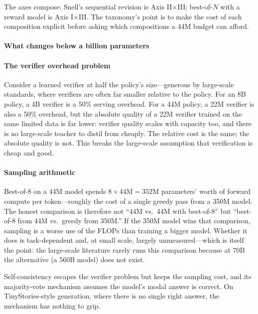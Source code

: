 The axes compose: Snell's sequential revision is Axis II$\times$III;
best-of-$N$ with a reward model is Axis I$\times$III. The taxonomy's
point is to make the cost of each composition explicit before asking
which compositions a 44M budget can afford.

\paragraph{What changes below a billion parameters}

\paragraph{The verifier overhead problem}

Consider a learned verifier at half the policy's size---generous by
large-scale standards, where verifiers are often far smaller
relative to the policy. For an 8B policy, a 4B verifier is a 50\%
serving overhead. For a 44M policy, a 22M verifier is also a 50\%
overhead, but the absolute quality of a 22M verifier trained on the
same limited data is far lower: verifier quality scales with capacity
too, and there is no large-scale teacher to distil from cheaply. The
relative cost is the same; the absolute quality is not. This breaks
the large-scale assumption that verification is cheap and good.

\paragraph{Sampling arithmetic}

Best-of-8 on a 44M model spends $8 \times 44\text{M} = 352\text{M}$
parameters' worth of forward compute per token---roughly the cost of a
single greedy pass from a 350M model. The honest comparison is therefore
not ``44M vs.\ 44M with best-of-8'' but ``best-of-8 from 44M vs.\
greedy from 350M.'' If the 350M model wins that comparison, sampling is
a worse use of the FLOPs than training a bigger model. Whether it does
is task-dependent and, at small scale, largely unmeasured---which is
itself the point: the large-scale literature rarely runs this
comparison because at 70B the alternative (a 560B model) does not exist.

Self-consistency escapes the verifier problem but keeps the sampling
cost, and its majority-vote mechanism assumes the model's modal answer
is correct. On TinyStories-style generation, where there is no single
right answer, the mechanism has nothing to grip.

